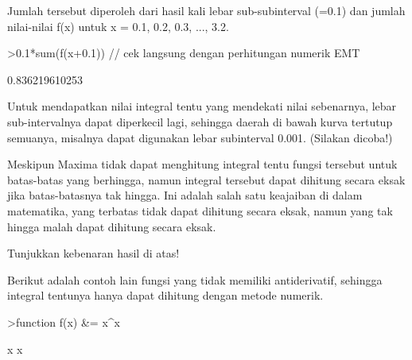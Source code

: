 \documentclass[a4paper,10pt]{article}
\begin{document}
\begin{eulernotebook}
\begin{eulercomment}
\begin{eulercomment}
\begin{eulercomment}
\begin{eulercomment}
\begin{eulercomment}
\begin{eulercomment}
\begin{eulercomment}
\begin{eulercomment}
\begin{eulercomment}
\begin{eulercomment}
\begin{eulercomment}
\begin{eulercomment}
\begin{eulercomment}
\begin{eulercomment}
\begin{eulercomment}
\begin{eulercomment}
\begin{eulercomment}
\begin{eulercomment}
\begin{eulercomment}
\begin{eulercomment}
\begin{eulercomment}
\begin{eulercomment}
\begin{eulercomment}
Jumlah tersebut diperoleh dari hasil kali lebar sub-subinterval (=0.1)
dan jumlah nilai-nilai f(x) untuk x = 0.1, 0.2, 0.3, ..., 3.2.
\end{eulercomment}
\begin{eulerprompt}
>0.1*sum(f(x+0.1)) // cek langsung dengan perhitungan numerik EMT
\end{eulerprompt}
\begin{euleroutput}
  0.836219610253
\end{euleroutput}
\begin{eulercomment}
Untuk mendapatkan nilai integral tentu yang mendekati nilai sebenarnya, lebar
sub-intervalnya dapat diperkecil lagi, sehingga daerah di bawah kurva tertutup
semuanya, misalnya dapat digunakan lebar subinterval 0.001. (Silakan dicoba!)

Meskipun Maxima tidak dapat menghitung integral tentu fungsi tersebut untuk
batas-batas yang berhingga, namun integral tersebut dapat dihitung secara eksak jika
batas-batasnya tak hingga. Ini adalah salah satu keajaiban di dalam matematika, yang
terbatas tidak dapat dihitung secara eksak, namun yang tak hingga malah dapat
dihitung secara eksak.
\end{eulercomment}
\begin{eulercomment}
Tunjukkan kebenaran hasil di atas!

Berikut adalah contoh lain fungsi yang tidak memiliki antiderivatif,
sehingga integral tentunya hanya dapat dihitung dengan metode numerik.
\end{eulercomment}
\begin{eulerprompt}
>function f(x) &= x^x
\end{eulerprompt}
\begin{euleroutput}
  
                                     x
                                    x
  

\end{euleroutput}
\end{eulercomment}
\end{eulercomment}
\end{eulercomment}
\end{eulercomment}
\end{eulercomment}
\end{eulercomment}
\end{eulercomment}
\end{eulercomment}
\end{eulercomment}
\end{eulercomment}
\end{eulercomment}
\end{eulercomment}
\end{eulercomment}
\end{eulercomment}
\end{eulercomment}
\end{eulercomment}
\end{eulercomment}
\end{eulercomment}
\end{eulercomment}
\end{eulercomment}
\end{eulercomment}
\end{eulercomment}
\end{eulernotebook}
\end{document}
